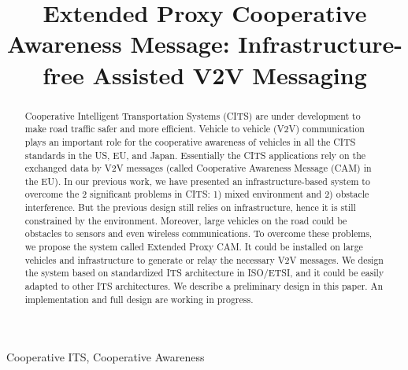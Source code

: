 \documentclass[conference,twocolumn]{IEEEtran}
\begin{document}
\title{Extended Proxy Cooperative Awareness Message: Infrastructure-free Assisted V2V Messaging}
\author{
}

\maketitle

\begin{abstract}
Cooperative Intelligent Transportation Systems
(CITS) are under development to make road traffic safer and more efficient.
Vehicle to vehicle (V2V) communication plays an important role for the cooperative
awareness of vehicles in all the CITS standards in the US, EU, and Japan.
Essentially the CITS applications rely on the exchanged data by V2V messages (called Cooperative Awareness Message (CAM) in the EU).
In our previous work, we have presented an infrastructure-based system to overcome the 2 significant problems in CITS:
1) mixed environment and 2) obstacle interference.
But the previous design still relies on infrastructure, hence it is still constrained by the environment.
Moreover, large vehicles on the road could be obstacles to sensors and even wireless communications.
To overcome these problems, we propose the system called Extended Proxy CAM.
It could be installed on large vehicles and infrastructure to generate or relay the necessary V2V messages.
We design the system based on standardized ITS architecture in ISO/ETSI, and it could be easily adapted to other ITS architectures.
We describe a preliminary design in this paper. An implementation and full design are working in progress.
\end{abstract}

\begin{IEEEkeywords}
Cooperative ITS, Cooperative Awareness
\end{IEEEkeywords}









\end{document}
